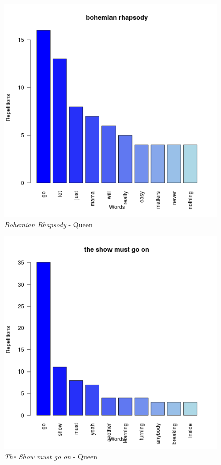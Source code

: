\begin{figure}[h]
	\centering
	\includegraphics[width=0.7\linewidth]{Imagenes/bohemianrhapsody}
	\caption{\textit{Bohemian Rhapsody} - Queen}
	\label{fig:bohemianrhapsody}
\end{figure}
\begin{figure}[h]
	\centering
	\includegraphics[width=0.7\linewidth]{Imagenes/theshowmustgoon}
	\caption{\textit{The Show must go on} - Queen}
	\label{fig:tsmgo}
\end{figure}

